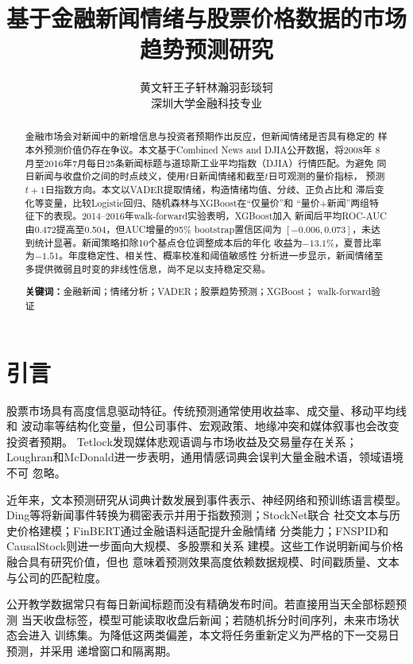 \documentclass[UTF8,a4paper,10pt,twocolumn,fontset=none]{ctexart}
\title{\vspace{-1.2cm}\textbf{基于金融新闻情绪与股票价格数据的市场趋势预测研究}}
\author{黄文轩\quad 王子轩\quad 林瀚羽\quad 彭琰轲\\
\small 深圳大学金融科技专业}
\date{}
\begin{document}
\maketitle
\vspace{-1.7em}
\begin{abstract}
\small
金融市场会对新闻中的新增信息与投资者预期作出反应，但新闻情绪是否具有稳定的
样本外预测价值仍存在争议。本文基于Combined News and DJIA公开数据，将2008年
8月至2016年7月每日25条新闻标题与道琼斯工业平均指数（DJIA）行情匹配。为避免
同日新闻与收盘价之间的时点歧义，使用$t$日新闻情绪和截至$t$日可观测的量价指标，
预测$t+1$日指数方向。本文以VADER提取情绪，构造情绪均值、分歧、正负占比和
滞后变化等变量，比较Logistic回归、随机森林与XGBoost在“仅量价”和
“量价+新闻”两组特征下的表现。2014--2016年walk-forward实验表明，XGBoost加入
新闻后平均ROC-AUC由0.472提高至0.504，但AUC增量的95\% bootstrap置信区间为
$[-0.006,0.073]$，未达到统计显著。新闻策略扣除10个基点仓位调整成本后的年化
收益为$-13.1\%$，夏普比率为$-1.51$。年度稳定性、相关性、概率校准和阈值敏感性
分析进一步显示，新闻情绪至多提供微弱且时变的非线性信息，尚不足以支持稳定交易。

\noindent\textbf{关键词：}金融新闻；情绪分析；VADER；股票趋势预测；XGBoost；
walk-forward验证
\end{abstract}
\vspace{0.4em}

\section{引言}

股票市场具有高度信息驱动特征。传统预测通常使用收益率、成交量、移动平均线和
波动率等结构化变量，但公司事件、宏观政策、地缘冲突和媒体叙事也会改变投资者预期。
Tetlock发现媒体悲观语调与市场收益及交易量存在关系\cite{tetlock}；
Loughran和McDonald进一步表明，通用情感词典会误判大量金融术语，领域语境不可
忽略\cite{lm}。

近年来，文本预测研究从词典计数发展到事件表示、神经网络和预训练语言模型。
Ding等将新闻事件转换为稠密表示并用于指数预测\cite{ding2015}；StockNet联合
社交文本与历史价格建模\cite{stocknet}；FinBERT通过金融语料适配提升金融情绪
分类能力\cite{finbert}；FNSPID和CausalStock则进一步面向大规模、多股票和关系
建模\cite{fnspid,causalstock}。这些工作说明新闻与价格融合具有研究价值，但也
意味着预测效果高度依赖数据规模、时间戳质量、文本与公司的匹配粒度。

公开教学数据常只有每日新闻标题而没有精确发布时间。若直接用当天全部标题预测
当天收盘标签，模型可能读取收盘后新闻；若随机拆分时间序列，未来市场状态会进入
训练集。为降低这两类偏差，本文将任务重新定义为严格的下一交易日预测，并采用
递增窗口和隔离期。
\end{document}
